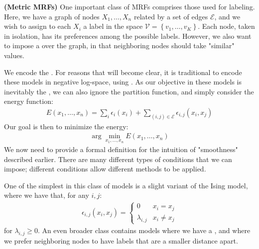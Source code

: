 \documentclass{article}
\newcommand{\bfs}[1]{\textbf{({#1}) }}
\begin{document}
\begin{exma}\bfs{Metric MRFs}
One important class of MRFs comprises those used for labeling. Here, we have a graph of nodes $X_{1}, \ldots, X_{n}$ related by a set of edges $\mathcal{E}$, and we wish to assign to each $X_{i}$ a label in the space $\mathcal{V}=\left\{v_{1}, \ldots, v_{K}\right\} .$ Each node, taken in isolation, has its preferences among the possible labels. However, we also want to impose a  over the graph, in that neighboring nodes should take "similar" values.

We encode the . For reasons that will become clear, it is traditional to encode these models in negative log-space, using . As our objective in these models is inevitably the , we can also ignore the partition function, and simply consider the energy function:
\begin{align*}
E\left(x_{1}, \ldots, x_{n}\right)=\sum_{i} \epsilon_{i}\left(x_{i}\right)+\sum_{(i, j) \in \mathcal{E}} \epsilon_{i, j}\left(x_{i}, x_{j}\right)
\end{align*}
Our goal is then to minimize the energy:
\begin{align*}
\arg \min _{x_{1}, \ldots, x_{n}} E\left(x_{1}, \ldots, x_{n}\right)
\end{align*}
We now need to provide a formal definition for the intuition of "smoothness" described earlier. There are many different types of conditions that we can impose; different conditions allow different methods to be applied.

One of the simplest in this class of models is a slight variant of the Ising model, where we have that, for any $i, j:$
\begin{align*}
\epsilon_{i, j}\left(x_{i}, x_{j}\right)= \begin{cases}0 & x_{i}=x_{j} \\ \lambda_{i, j} & x_{i} \neq x_{j}\end{cases}
\end{align*}
for $\lambda_{i, j} \geq 0$. An even broader class contains models where we have a , and where we prefer neighboring nodes to have labels that are a smaller distance apart.
\end{exma} 
\end{document}
